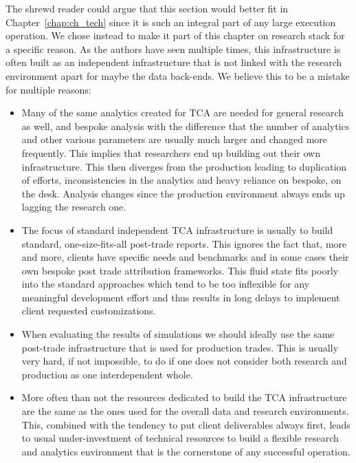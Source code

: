 The shrewd reader could argue that this section would better fit in Chapter~\ref{chap:ch_tech} since it is such an integral part of any large execution operation. We chose instead to make it part of this chapter on research stack for a specific reason. As the authors have seen multiple times, this infrastructure is often built as an independent infrastructure that is not linked with the research environment apart for maybe the data back-ends. We believe this to be a mistake for multiple reasons:
\begin{itemize}
\item Many of the same analytics created for TCA are needed for general research as well, and bespoke analysis with the difference that the number of analytics and other various parameters are usually much larger and changed more frequently. This implies that researchers end up building out their own infrastructure. This then diverges from the production leading to duplication of efforts, inconsistencies in the analytics and heavy reliance on bespoke, on the desk. Analysis changes since the production environment always ends up lagging the research one.
\item The focus of standard independent TCA infrastructure is usually to build standard, one-size-fits-all post-trade reports. This ignores the fact that, more and more, clients have specific needs and benchmarks and in some cases their own bespoke post trade attribution frameworks. This fluid state fits poorly into the standard approaches which tend to be too inflexible for any meaningful development effort and thus results in long delays to implement client requested customizations.
\item When evaluating the results of simulations we should ideally use the same post-trade infrastructure that is used for production trades. This is usually very hard, if not impossible, to do if one does not consider both research and production as one interdependent whole.
\item More often than not the resources dedicated to build the TCA infrastructure are the same as the ones used for the overall data and research environments. This, combined with the tendency to put client deliverables always first, leads to usual under-investment of technical resources to build a flexible research and analytics environment that is the cornerstone of any successful operation.
\end{itemize}



